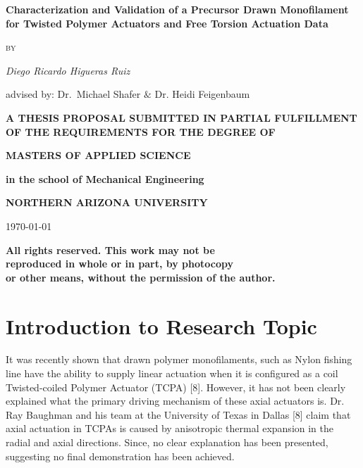 \documentclass[12pt,oneside]{article}
\begin{document}
\begin{titlepage}
	\centering
	{\huge\bfseries Characterization and Validation of a Precursor Drawn Monofilament for Twisted Polymer Actuators and Free Torsion Actuation Data\par}
	\vspace{1cm}
	{\scshape\LARGE by\par}
	\vspace{1cm}
	{\LARGE\itshape Diego Ricardo Higueras Ruiz\par}
	\vspace{1cm}
	{\large advised by: Dr.~Michael Shafer $\&$ Dr. Heidi Feigenbaum\par}
	\vspace{2cm}
	{\large\bfseries A THESIS PROPOSAL SUBMITTED IN PARTIAL FULFILLMENT OF THE REQUIREMENTS FOR THE DEGREE OF \par}
	\vspace{0.5cm}
	{\large\bfseries MASTERS OF APPLIED SCIENCE \par}
	{\large\bfseries in the school of Mechanical Engineering \par}
	\vspace{0.5cm}
	{\large\bfseries NORTHERN ARIZONA UNIVERSITY \par}
	\vspace{2cm}
	{\LARGE \today\par}
	\vfill
	{\large\bfseries All rights reserved. This work may not be \\ reproduced in whole or in part, by photocopy \\ or other means, without the permission of the author. \par}
	
\end{titlepage}

\section*{Introduction to Research Topic}
	\hspace{0.4cm}It was recently shown that drawn polymer monofilaments, such as Nylon fishing line have the ability to supply linear actuation when it is configured as a coil Twisted-coiled Polymer Actuator (TCPA) [8]. However, it has not been clearly explained what the primary driving mechanism of these axial actuators is. Dr. Ray Baughman and his team at the University of Texas in Dallas [8] claim that axial actuation in TCPAs is caused by anisotropic thermal expansion in the radial and axial directions. Since, no clear explanation has been presented, suggesting no final demonstration has been achieved.\par	
	
\end{document}
